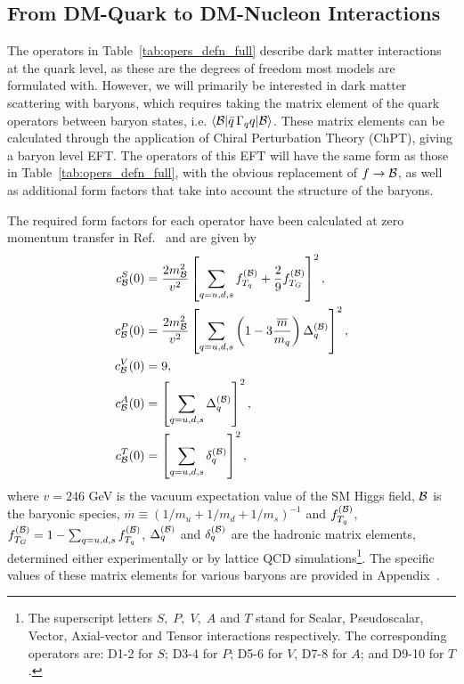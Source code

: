 \subsection{From DM-Quark to DM-Nucleon Interactions}

The operators in Table~\ref{tab:opers_defn_full} describe dark matter interactions at the quark level, as these are the degrees of freedom most models are formulated with. However, we will primarily be interested in dark matter scattering with baryons, which requires taking the matrix element of the quark operators between baryon states, i.e. $\langle {\cal B} | \bar q \, \Gamma_q q| {\cal B}\rangle$. These matrix elements can be calculated through the application of Chiral Perturbation Theory (ChPT), giving a baryon level EFT. The operators of this EFT will have the same form as those in Table~\ref{tab:opers_defn_full}, with the obvious replacement of $f\rightarrow \cal B$, as well as additional form factors that take into account the structure of the baryons.

The required form factors for each operator have been calculated at zero momentum transfer in Ref.~\cite{Cirelli:2013ufw_oct_Toolsmodelindependentbounds} and are given by 
\begin{align}
c_{\cal B}^S(0) &= \frac{2 m_{\cal B}^2}{v^2}\left[\sum_{q=u,d,s}f_{T_q}^{(\cal B)}+\frac{2}{9}f_{T_G}^{(\cal B)}\right]^2,\\
c_{\cal B}^P(0) &= \frac{2 m_{\cal B}^2}{v^2}\left[\sum_{q=u,d,s}\left(1-3\frac{\overline{m}}{m_q}\right)\Delta_q^{(\cal B)}\right]^2,\\
c_{\cal B}^V(0) &= 9,\\
c_{\cal B}^A(0) &=  \left[\sum_{q=u,d,s}\Delta_q^{(\cal B)}\right]^2,\\
c_{\cal B}^T(0) &= \left[\sum_{q=u,d,s}\delta_q^{(\cal B)}\right]^2,
\end{align}
where  $v=246$ GeV is the vacuum expectation value of the SM Higgs field, $\cal B$ is the baryonic species,  $\overline{m}\equiv(1/m_u+1/m_d+1/m_s)^{-1}$ and $f_{T_q}^{(\cal B)}$, $f_{T_G}^{(\cal B)}=1-\sum_{q=u,d,s} f_{T_q}^{(\cal B)}$, $\Delta_q^{(\cal B)}$ and $\delta_q^{(\cal B)}$ are the hadronic matrix elements, determined either experimentally or by lattice QCD simulations\footnote{The superscript letters $S,\;P,\;V,\;A$ and $T$ stand for Scalar, Pseudoscalar, Vector, Axial-vector and Tensor interactions respectively. The corresponding operators are: D1-2 for $S$; D3-4 for $P$; D5-6 for $V$, D7-8 for $A$; and D9-10 for $T$.}. The specific values of these matrix elements for various baryons are provided in Appendix~.

